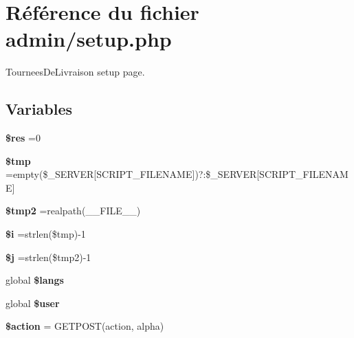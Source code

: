 \hypertarget{setup_8php}{}\section{Référence du fichier admin/setup.php}
\label{setup_8php}


Tournees\+De\+Livraison setup page.  


\subsection*{Variables}
\begin{DoxyCompactItemize}
\item 
\mbox{\label{setup_8php_a49a8a4009b02e49717caa88b128affc5}} 
{\bfseries \$res} =0
\item 
\mbox{\label{setup_8php_a57024d47cf8348153f5fdda16f8fefa9}} 
{\bfseries \$tmp} =empty(\$\+\_\+\+S\+E\+R\+V\+ER\mbox{[}\textquotesingle{}S\+C\+R\+I\+P\+T\+\_\+\+F\+I\+L\+E\+N\+A\+ME\textquotesingle{}\mbox{]})?\textquotesingle{}\textquotesingle{}\+:\$\+\_\+\+S\+E\+R\+V\+ER\mbox{[}\textquotesingle{}S\+C\+R\+I\+P\+T\+\_\+\+F\+I\+L\+E\+N\+A\+ME\textquotesingle{}\mbox{]}
\item 
\mbox{\label{setup_8php_aed9bcb6730d1510376ce80e32bd9504d}} 
{\bfseries \$tmp2} =realpath(\+\_\+\+\_\+\+F\+I\+L\+E\+\_\+\+\_\+)
\item 
\mbox{\label{setup_8php_a83018d9153d17d91fbcf3bc10158d34f}} 
{\bfseries \$i} =strlen(\$tmp)-\/1
\item 
\mbox{\label{setup_8php_a6f16db779ef3ccea921b277b5dc245d1}} 
{\bfseries \$j} =strlen(\$tmp2)-\/1
\item 
\mbox{\label{setup_8php_a29be2d9bc87fa3c921824a078a22e09a}} 
global {\bfseries \$langs}
\item 
\mbox{\label{setup_8php_a00365e6c5f70c43fb2ed86c9bc5626e0}} 
global {\bfseries \$user}
\item 
\mbox{\label{setup_8php_aa698a3e72116e8e778be0e95d908ee30}} 
{\bfseries \$action} = G\+E\+T\+P\+O\+ST(\textquotesingle{}action\textquotesingle{}, \textquotesingle{}alpha\textquotesingle{})

\end{DoxyCompactItemize}
